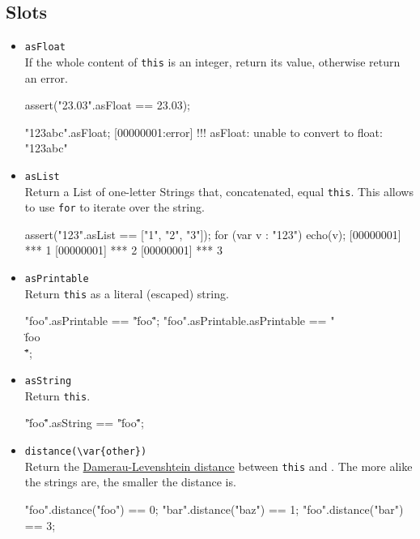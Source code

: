 \subsection{Slots}
\begin{itemize}
\item \lstinline|asFloat|\\
  If the whole content of \lstinline|this| is an integer, return its
  value, otherwise return an error.
\begin{urbiscript}
assert("23.03".asFloat == 23.03);

"123abc".asFloat;
[00000001:error] !!! asFloat: unable to convert to float: "123abc"
\end{urbiscript}

\item \lstinline|asList|\\
  Return a List of one-letter Strings that, concatenated, equal
  \lstinline|this|.  This allows to use \lstinline|for| to iterate
  over the string.
\begin{urbiscript}
assert("123".asList == ["1", "2", "3"]);
for (var v : "123")
  echo(v);
[00000001] *** 1
[00000001] *** 2
[00000001] *** 3
\end{urbiscript}

\item \lstinline|asPrintable|\\
  Return \lstinline|this| as a literal (escaped) string.
\begin{urbiassert}
"foo".asPrintable == "\"foo\"";
"foo".asPrintable.asPrintable == "\"\\\"foo\\\"\"";
\end{urbiassert}

\item \lstinline|asString|\\
  Return \lstinline|this|.
\begin{urbiassert}
"\"foo\"".asString == "\"foo\"";
\end{urbiassert}

\item \lstinline|distance(\var{other})|\\
  Return the
  \href{http://en.wikipedia.org/wiki/Damerau-Levenshtein_distance}
  {Damerau-Levenshtein distance} between \lstinline|this| and
  .  The more alike the strings are, the smaller the
  distance is.
\begin{urbiassert}
"foo".distance("foo") == 0;
"bar".distance("baz") == 1;
"foo".distance("bar") == 3;
\end{urbiassert}


\end{itemize}
